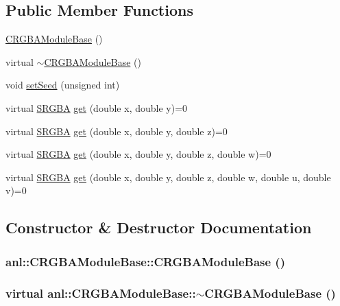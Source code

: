 \subsection*{Public Member Functions}
\begin{DoxyCompactItemize}
\item 
\hyperlink{classanl_1_1CRGBAModuleBase_a37faa0d4d7ceb3ceeb36663ae2ea04e1}{CRGBAModuleBase} ()
\item 
virtual \hyperlink{classanl_1_1CRGBAModuleBase_acb6596b2518d395cf5e77d3890491327}{$\sim$CRGBAModuleBase} ()
\item 
void \hyperlink{classanl_1_1CRGBAModuleBase_abfb4be6818050558755c213501070e51}{setSeed} (unsigned int)
\item 
virtual \hyperlink{structanl_1_1SRGBA}{SRGBA} \hyperlink{classanl_1_1CRGBAModuleBase_afb6896d38ae92b9bb784fe5dc731ae67}{get} (double x, double y)=0
\item 
virtual \hyperlink{structanl_1_1SRGBA}{SRGBA} \hyperlink{classanl_1_1CRGBAModuleBase_a097897c2d625c824832325260169c90e}{get} (double x, double y, double z)=0
\item 
virtual \hyperlink{structanl_1_1SRGBA}{SRGBA} \hyperlink{classanl_1_1CRGBAModuleBase_ab94523074ef298bb99f0830051e78c1c}{get} (double x, double y, double z, double w)=0
\item 
virtual \hyperlink{structanl_1_1SRGBA}{SRGBA} \hyperlink{classanl_1_1CRGBAModuleBase_aa5a0b719101302596a697aa8c2292f55}{get} (double x, double y, double z, double w, double u, double v)=0
\end{DoxyCompactItemize}


\subsection{Constructor \& Destructor Documentation}
\hypertarget{classanl_1_1CRGBAModuleBase_a37faa0d4d7ceb3ceeb36663ae2ea04e1}{
\subsubsection[{CRGBAModuleBase}]{\setlength{\rightskip}{0pt plus 5cm}anl::CRGBAModuleBase::CRGBAModuleBase ()}}
\label{classanl_1_1CRGBAModuleBase_a37faa0d4d7ceb3ceeb36663ae2ea04e1}
\hypertarget{classanl_1_1CRGBAModuleBase_acb6596b2518d395cf5e77d3890491327}{
\subsubsection[{$\sim$CRGBAModuleBase}]{\setlength{\rightskip}{0pt plus 5cm}virtual anl::CRGBAModuleBase::$\sim$CRGBAModuleBase ()}}
\label{classanl_1_1CRGBAModuleBase_acb6596b2518d395cf5e77d3890491327}


